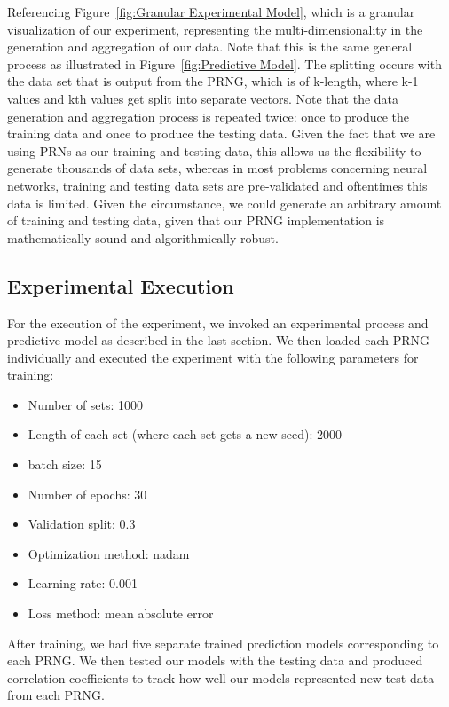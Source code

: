 \documentclass[conference]{IEEEtran}
\begin{document}
Referencing Figure~\ref{fig:Granular Experimental Model}, which is a granular visualization of our experiment, representing the multi-dimensionality in the generation and aggregation of our data. Note that this is the same general process as illustrated in Figure~\ref{fig:Predictive Model}. The splitting occurs with the data set that is output from the PRNG, which is of k-length, where k-1 values and kth values get split into separate vectors. Note that the data generation and aggregation process is repeated twice: once to produce the training data and once to produce the testing data. Given the fact that we are using PRNs as our training and testing data, this allows us the flexibility to generate thousands of data sets, whereas in most problems concerning neural networks, training and testing data sets are pre-validated and oftentimes this data is limited. Given the circumstance, we could generate an arbitrary amount of training and testing data, given that our PRNG implementation is mathematically sound and algorithmically robust.

\subsection{Experimental Execution}
For the execution of the experiment, we invoked an experimental process and predictive model as described in the last section. We then loaded each PRNG individually and executed the experiment with the following parameters for training: 
\begin{itemize}
\item Number of sets: 1000
\item Length of each set (where each set gets a new seed): 2000
\item batch size: 15
\item Number of epochs: 30
\item Validation split: 0.3
\item Optimization method: nadam
\item Learning rate: 0.001
\item Loss method: mean absolute error
\end{itemize}

After training, we had five separate trained prediction models corresponding to each PRNG. We then tested our models with the testing data and produced correlation coefficients to track how well our models represented new test data from each PRNG.

\end{document}
